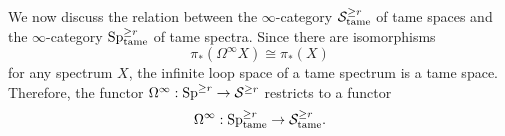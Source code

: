 		


	



We now discuss the relation between the $\infty$-category ${\mathcal{S}}^{\geq r}_{\operatorname{\operatorname{tame}}}$ of tame spaces and the $\infty$-category $\operatorname{Sp}^{\geq r}_{\operatorname{\operatorname{tame}}}$ of tame spectra.
Since there are isomorphisms
$$
\pi_*(\Omega^{\infty}X) \cong \pi_* (X)
$$
for any spectrum $X$,
		the infinite loop space of a tame spectrum is a tame space. 
Therefore, the functor $\Omega^{\infty}:\operatorname{Sp}^{\geq r}\to 
{\mathcal{S}}^{\geq r}$ restricts to a functor
$$
\Omega^{\infty}: \operatorname{Sp}^{\geq r}_{\operatorname{\operatorname{tame}}} 
\to 
{\mathcal{S}}^{\geq r}_{\operatorname{\operatorname{tame}}}.
$$



